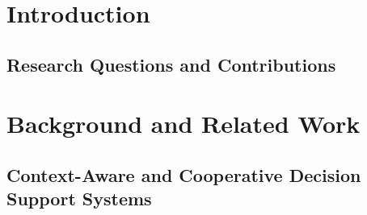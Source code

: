 \documentclass[mathematics,article,submit,moreauthors]{Definitions/mdpi}
\begin{document}

\section{Introduction}





\subsection{Research Questions and Contributions}



\section{Background and Related Work}


\subsection{Context-Aware and Cooperative Decision Support Systems}
\label{subsec:context-aware-dss}
\end{document}

